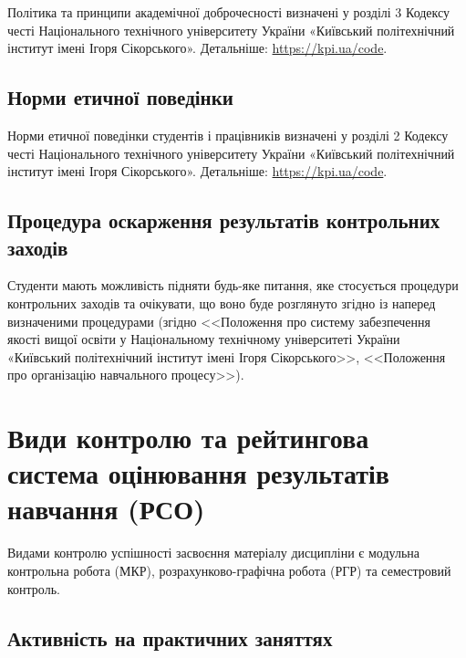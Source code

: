 \documentclass{Syllabus}
\begin{document}
Політика та принципи академічної доброчесності визначені у розділі 3 Кодексу честі Національного технічного університету України «Київський політехнічний інститут імені Ігоря Сікорського». Детальніше: \url{https://kpi.ua/code}.

\subsection*{Норми етичної поведінки}

Норми етичної поведінки студентів і працівників визначені у розділі 2 Кодексу честі Національного технічного університету України «Київський політехнічний інститут імені Ігоря Сікорського». Детальніше: \url{https://kpi.ua/code}.

\subsection*{Процедура оскарження результатів контрольних заходів}

Студенти мають можливість підняти будь-яке питання, яке стосується процедури контрольних заходів та очікувати, що воно буде розглянуто згідно із наперед визначеними процедурами (згідно <<Положення про систему забезпечення якості вищої освіти у Національному технічному університеті України «Київський політехнічний інститут імені Ігоря Сікорського>>, <<Положення про організацію навчального процесу>>).

\section{Види контролю та рейтингова система оцінювання результатів навчання (РСО)}

%

Видами контролю успішності засвоєння матеріалу дисципліни є  модульна контрольна робота (МКР), розрахунково-графічна робота (РГР) та семестровий контроль.


\subsection*{Активність на практичних заняттях}
\end{document}
